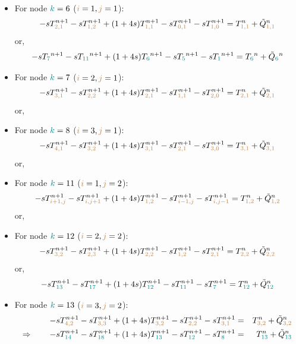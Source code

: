 \begin{itemize}
\item For node ${\color{teal}k}=6$ (${\color{brown}i}=1,{\color{brown}j}=1$):
\[
-s T_{{\color{brown}2,1}}^{n+1}
-s T_{{\color{brown}1,2}}^{n+1} 
+(1+4s)T_{{\color{brown}1,1}}^{n+1} 
-s T_{{\color{brown}0,1}}^{n+1} 
-s T_{{\color{brown}1,0}}^{n+1} 
= T_{{\color{brown}1,1}}^n +\tilde{Q}_{{\color{brown}1,1}}^n
\]
or, 
\[
-s T_{\color{teal} 7}^{n+1}-s T_{\color{teal} 11}^{n+1} +(1+4s)T_{\color{teal} 6}^{n+1} -s T_{\color{teal} 5}^{n+1} -s T_{\color{teal} 1}^{n+1} 
= T_{\color{teal} 6}^n +\tilde{Q}_{\color{teal} 6}^n
\]

\item For node ${\color{teal}k}=7$ (${\color{brown}i}=2,{\color{brown}j}=1$):
\[
-s T_{{\color{brown} 3,1}}^{n+1}
-s T_{{\color{brown}2,2}}^{n+1} 
+(1+4s)T_{{\color{brown}2,1}}^{n+1} 
-s T_{{\color{brown}1,1}}^{n+1} 
-s T_{{\color{brown}2,0}}^{n+1} 
= T_{{\color{brown}2,1}}^n 
+\tilde{Q}_{{\color{brown}2,1}}^n
\]
or,

\item For node ${\color{teal}k}=8$ (${\color{brown}i}=3,{\color{brown}j}=1$):
\[
-s T_{{\color{brown} 4,1}}^{n+1}
-s T_{{\color{brown}3,2}}^{n+1} 
+(1+4s)T_{{\color{brown}3,1}}^{n+1} 
-s T_{{\color{brown}2,1}}^{n+1} 
-s T_{{\color{brown}3,0}}^{n+1} 
= T_{{\color{brown}3,1}}^n 
+\tilde{Q}_{{\color{brown}3,1}}^n
\]
or,
\item For node ${\color{teal}k}=11$ (${\color{brown}i}=1,{\color{brown}j}=2$):
\[
-s T_{{\color{brown} i+1,j}}^{n+1}
-s T_{{\color{brown}i,j+1}}^{n+1} 
+(1+4s)T_{{\color{brown}1,2}}^{n+1} 
-s T_{{\color{brown}i-1,j}}^{n+1} 
-s T_{{\color{brown}i,j-1}}^{n+1} 
= T_{{\color{brown}1,2}}^n 
+\tilde{Q}_{{\color{brown}1,2}}^n
\]
or,
\item For node ${\color{teal}k}=12$ (${\color{brown}i}=2,{\color{brown}j}=2$):
\[
-s T_{{\color{brown} 3,2}}^{n+1}
-s T_{{\color{brown}2,3}}^{n+1} 
+(1+4s)T_{{\color{brown}2,2}}^{n+1} 
-s T_{{\color{brown}1,2}}^{n+1} 
-s T_{{\color{brown}2,1}}^{n+1} 
= T_{{\color{brown}2,2}}^n 
+\tilde{Q}_{{\color{brown}2,2}}^n
\]
or,
\[
-s T_{{\color{teal} 13}}^{n+1}
-s T_{{\color{teal} 17}}^{n+1} 
+(1+4s)T_{{\color{teal}12}}^{n+1} 
-s T_{{\color{teal}11}}^{n+1} 
-s T_{{\color{teal}7}}^{n+1} 
= T_{{\color{teal}12}}^n 
+\tilde{Q}_{{\color{teal}12}}^n
\]


\item For node ${\color{teal}k}=13$ (${\color{brown}i}=3,{\color{brown}j}=2$):
\begin{eqnarray}
-s T_{{\color{brown} 4,2}}^{n+1}
-s T_{{\color{brown}3,3}}^{n+1} 
+(1+4s)T_{{\color{brown}3,2}}^{n+1} 
-s T_{{\color{brown}2,2}}^{n+1} 
-s T_{{\color{brown}3,1}}^{n+1} 
&=& T_{{\color{brown}3,2}}^n 
+\tilde{Q}_{{\color{brown}3,2}}^n \nonumber\\
\Rightarrow \qquad
-s T_{{\color{teal} 14}}^{n+1}
-s T_{{\color{teal} 18}}^{n+1} 
+(1+4s)T_{{\color{teal}13}}^{n+1} 
-s T_{{\color{teal}12}}^{n+1} 
-s T_{{\color{teal}8}}^{n+1} 
&=& T_{{\color{teal}13}}^n 
+\tilde{Q}_{{\color{teal}13}}^n \nonumber
\end{eqnarray}


\end{itemize}

